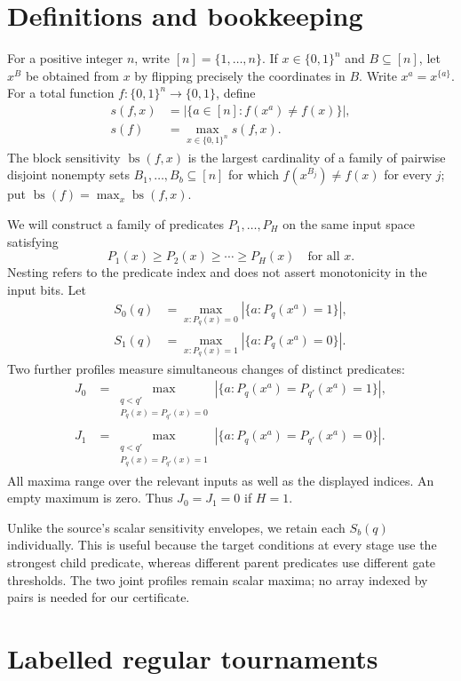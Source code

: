 \documentclass[11pt]{article}
\theoremstyle{definition}
\theoremstyle{remark}
\DeclareMathOperator{\bs}{bs}
\newcommand{\sens}{s}
\newcommand{\bits}{\{0,1\}}
\begin{document}
\section{Definitions and bookkeeping}

For a positive integer $n$, write $[n]=\{1,\ldots,n\}$.  If
$x\in\bits^n$ and $B\subseteq[n]$, let $x^B$ be obtained from $x$ by
flipping precisely the coordinates in $B$.  Write $x^a=x^{\{a\}}$.
For a total function $f:\bits^n\to\bits$, define
\begin{align*}
 \sens(f,x)&=|\{a\in[n]:f(x^a)\ne f(x)\}|,\\
 \sens(f)&=\max_{x\in\bits^n}\sens(f,x).
\end{align*}
The block sensitivity $\bs(f,x)$ is the largest cardinality of a family
of pairwise disjoint nonempty sets $B_1,\ldots,B_b\subseteq[n]$ for
which $f(x^{B_j})\ne f(x)$ for every $j$; put
$\bs(f)=\max_x\bs(f,x)$.

We will construct a family of predicates $P_1,\ldots,P_H$ on the same
input space satisfying
\[
                    P_1(x)\ge P_2(x)\ge\cdots\ge P_H(x)
                    \quad\text{for all }x.
\]
Nesting refers to the predicate index and does not assert monotonicity
in the input bits.  Let
\begin{align*}
 S_0(q)&=\max_{x:P_q(x)=0}|\{a:P_q(x^a)=1\}|,\\
 S_1(q)&=\max_{x:P_q(x)=1}|\{a:P_q(x^a)=0\}|.
\end{align*}
Two further profiles measure simultaneous changes of distinct
predicates:
\begin{align*}
 J_0&=\max_{\substack{q<q'\\P_q(x)=P_{q'}(x)=0}}
       |\{a:P_q(x^a)=P_{q'}(x^a)=1\}|,\\
 J_1&=\max_{\substack{q<q'\\P_q(x)=P_{q'}(x)=1}}
       |\{a:P_q(x^a)=P_{q'}(x^a)=0\}|.
\end{align*}
All maxima range over the relevant inputs as well as the displayed
indices.  An empty maximum is zero.  Thus $J_0=J_1=0$ if $H=1$.

Unlike the source's scalar sensitivity envelopes, we retain each
$S_b(q)$ individually.  This is useful because the target conditions at
every stage use the strongest child predicate, whereas different parent
predicates use different gate thresholds.  The two joint profiles remain
scalar maxima; no array indexed by pairs is needed for our certificate.

\section{Labelled regular tournaments}
\label{sec:labels}
\end{document}
